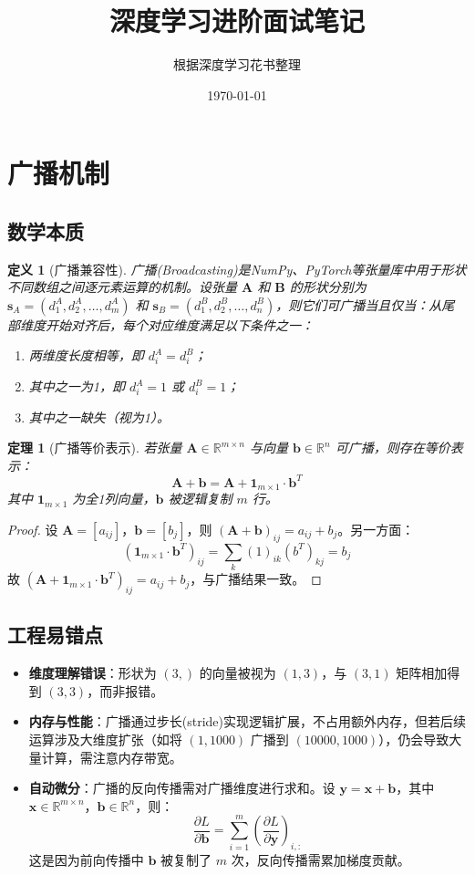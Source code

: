 \documentclass[UTF8, 10pt]{ctexart}
\title{\textbf{深度学习进阶面试笔记}}
\author{根据深度学习花书整理}
\date{\today}
\newtheorem{theorem}{定理}[section]
\newtheorem{definition}{定义}[section]
\newcommand{\R}{\mathbb{R}}
\begin{document}
\maketitle
\tableofcontents
\newpage

\section{广播机制}
\subsection{数学本质}
\begin{definition}[广播兼容性]
广播(Broadcasting)是NumPy、PyTorch等张量库中用于形状不同数组之间逐元素运算的机制。设张量 $\bm{A}$ 和 $\bm{B}$ 的形状分别为 $\bm{s}_A = (d_1^A, d_2^A, \ldots, d_m^A)$ 和 $\bm{s}_B = (d_1^B, d_2^B, \ldots, d_n^B)$，则它们可广播当且仅当：从尾部维度开始对齐后，每个对应维度满足以下条件之一：
\begin{enumerate}
    \item 两维度长度相等，即 $d_i^A = d_i^B$；
    \item 其中之一为1，即 $d_i^A = 1$ 或 $d_i^B = 1$；
    \item 其中之一缺失（视为1）。
\end{enumerate}
\end{definition}

\begin{theorem}[广播等价表示]
若张量 $\bm{A} \in \R^{m \times n}$ 与向量 $\bm{b} \in \R^{n}$ 可广播，则存在等价表示：
\[
\bm{A} + \bm{b} = \bm{A} + \bm{1}_{m \times 1} \cdot \bm{b}^T
\]
其中 $\bm{1}_{m \times 1}$ 为全1列向量，$\bm{b}$ 被逻辑复制 $m$ 行。
\end{theorem}

\begin{proof}
设 $\bm{A} = [a_{ij}]$，$\bm{b} = [b_j]$，则 $(\bm{A} + \bm{b})_{ij} = a_{ij} + b_j$。另一方面：
\[
(\bm{1}_{m \times 1} \cdot \bm{b}^T)_{ij} = \sum_k (1)_{ik} (b^T)_{kj} = b_j
\]
故 $(\bm{A} + \bm{1}_{m \times 1} \cdot \bm{b}^T)_{ij} = a_{ij} + b_j$，与广播结果一致。
\end{proof}

\subsection{工程易错点}
\begin{itemize}
    \item \textbf{维度理解错误}：形状为 $(3,)$ 的向量被视为 $(1,3)$，与 $(3,1)$ 矩阵相加得到 $(3,3)$，而非报错。
    \item \textbf{内存与性能}：广播通过步长(stride)实现逻辑扩展，不占用额外内存，但若后续运算涉及大维度扩张（如将 $(1,1000)$ 广播到 $(10000,1000)$），仍会导致大量计算，需注意内存带宽。
    \item \textbf{自动微分}：广播的反向传播需对广播维度进行求和。设 $\bm{y} = \bm{x} + \bm{b}$，其中 $\bm{x} \in \R^{m \times n}$，$\bm{b} \in \R^n$，则：
    \[
    \frac{\partial L}{\partial \bm{b}} = \sum_{i=1}^{m} \left( \frac{\partial L}{\partial \bm{y}} \right)_{i,:}
    \]
    这是因为前向传播中 $\bm{b}$ 被复制了 $m$ 次，反向传播需累加梯度贡献。
\end{itemize}
\end{document}
